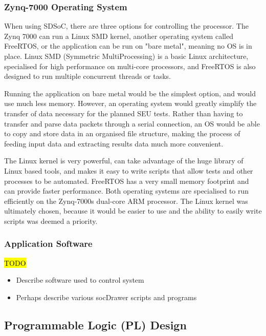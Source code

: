 \documentclass[12pt]{article}
\begin{document}
\subsubsection{Zynq-7000 Operating System}
\label{sec:Design-PS-OS}

When using SDSoC, there are three options for controlling the processor. The Zynq 7000 can run a Linux SMD kernel, another operating system called FreeRTOS, or the application can be run on "bare metal", meaning no OS is in place. Linux SMD (Symmetric MultiProcessing) is a basic Linux architecture, specialised for high performance on multi-core processors, and FreeRTOS is also designed to run multiple concurrent threads or tasks.

Running the application on bare metal would be the simplest option, and would use much less memory. However, an operating system would greatly simplify the transfer of data necessary for the planned SEU tests. Rather than having to transfer and parse data packets through a serial connection, an OS would be able to copy and store data in an organised file structure, making the process of feeding input data and extracting results data much more convenient.

The Linux kernel is very powerful, can take advantage of the huge library of Linux based tools, and makes it easy to write scripts that allow tests and other processes to be automated. FreeRTOS has a very small memory footprint and can provide faster performance. Both operating systems are specialised to run efficiently on the Zynq-7000s dual-core ARM processor. The Linux kernel was ultimately chosen, because it would be easier to use and the ability to easily write scripts was deemed a priority.

\subsubsection{Application Software}
\label{sec:Design-PS-SW}

\hl{TODO}

\begin{itemize}
\item Describe software used to control system
\item Perhaps describe various socDrawer scripts and programs
\end{itemize}

\subsection{Programmable Logic (PL) Design}
\label{sec:Design-PL}
\end{document}
